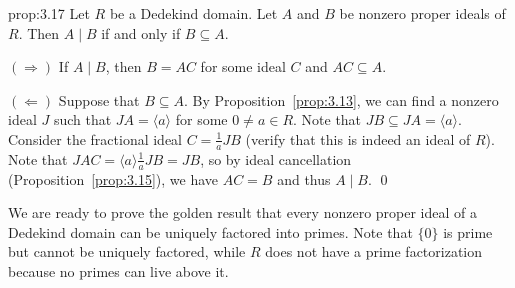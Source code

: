 \begin{prop}{prop:3.17}
    Let $R$ be a Dedekind domain. Let $A$ and $B$ be nonzero proper ideals of $R$. 
    Then $A \mid B$ if and only if $B \subseteq A$. 
\end{prop}\vspace{-0.25cm}
\begin{pf}
    $(\Rightarrow)$ If $A \mid B$, then $B = AC$ for some ideal $C$ and $AC \subseteq A$.

    $(\Leftarrow)$ Suppose that $B \subseteq A$. By Proposition~\ref{prop:3.13},
    we can find a nonzero ideal $J$ such that $JA = \langle a \rangle$ for some 
    $0 \neq a \in R$. Note that $JB \subseteq JA = \langle a \rangle$. 
    Consider the fractional ideal $C = \frac1a JB$ (verify that this is 
    indeed an ideal of $R$). Note that $JAC = \langle a \rangle \frac1a JB = JB$,
    so by ideal cancellation (Proposition~\ref{prop:3.15}), we have 
    $AC = B$ and thus $A \mid B$. \qed
\end{pf}\vspace{-0.25cm}

We are ready to prove the golden result that every nonzero proper ideal 
of a Dedekind domain can be uniquely factored into primes. Note that $\{0\}$ 
is prime but cannot be uniquely factored, while $R$ does not have a prime 
factorization because no primes can live above it. 

